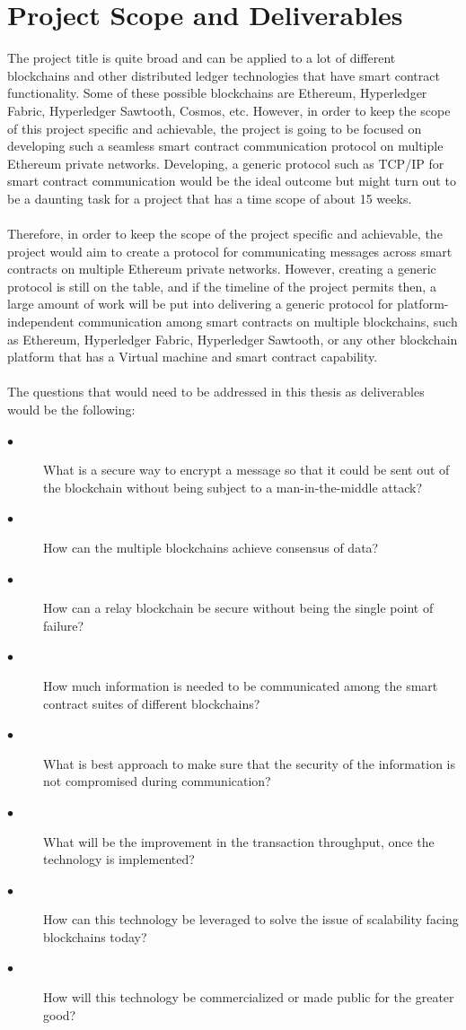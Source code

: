 \documentclass[a4paper,twoside,phd]{BYUPhys}
\begin{document}
\section{Project Scope and Deliverables}
The project title is quite broad and can be applied to a lot of different blockchains and other distributed ledger technologies that have smart contract functionality. Some of these possible blockchains are Ethereum, Hyperledger Fabric, Hyperledger Sawtooth, Cosmos, etc. However, in order to keep the scope of this project specific and achievable, the project is going to be focused on developing such a seamless smart contract communication protocol on multiple Ethereum private networks. Developing, a generic protocol such as TCP/IP for smart contract communication would be the ideal outcome but might turn out to be a daunting task for a project that has a time scope of about 15 weeks.
\\
\\
Therefore, in order to keep the scope of the project specific and achievable, the project would aim to create a protocol for communicating messages across smart contracts on multiple Ethereum private networks. However, creating a generic protocol is still on the table, and if the timeline of the project permits then, a large amount of work will be put into delivering a generic protocol for platform-independent communication among smart contracts on multiple blockchains, such as Ethereum, Hyperledger Fabric, Hyperledger Sawtooth, or any other blockchain platform that has a Virtual machine and smart contract capability.
\\
\\
The questions that would need to be addressed in this thesis as deliverables would be the following:
\begin{description}
\item[$\bullet$]What is a secure way to encrypt a message so that it could be sent out of the blockchain without being subject to a man-in-the-middle attack?
\item[$\bullet$]How can the multiple blockchains achieve consensus of data?
\item[$\bullet$]How can a relay blockchain be secure without being the single point of failure?
\item[$\bullet$]How much information is needed to be communicated among the smart contract suites of different blockchains?
\item[$\bullet$]What is best approach to make sure that the security of the information is not compromised during communication?
\item[$\bullet$]What will be the improvement in the transaction throughput, once the technology is implemented?
\item[$\bullet$]How can this technology be leveraged to solve the issue of scalability facing
blockchains today?
\item[$\bullet$]How will this technology be commercialized or made public for the greater good?
\end{description}
\end{document}
